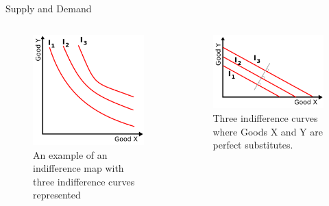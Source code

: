 \documentclass{beamer}
\begin{document}
\begin{frame}{Supply and Demand}

\begin{columns}[onlytextwidth]

	\begin{figure}[htpb]
		\centering
		\includegraphics[width=0.8\linewidth]{../img/indifferent1.png}
		\caption{An example of an indifference map with three
		indifference curves represented}
		\label{fig:indif1}
	\end{figure}

	\begin{figure}[htpb]
		\centering
		\includegraphics[width=0.8\linewidth]{../img/indifferent2.png}
		\caption{Three indifference curves where Goods X and Y are
			perfect substitutes.}
		\label{fig:indif2}
	\end{figure}


\end{columns}
\end{frame}
\end{document}
